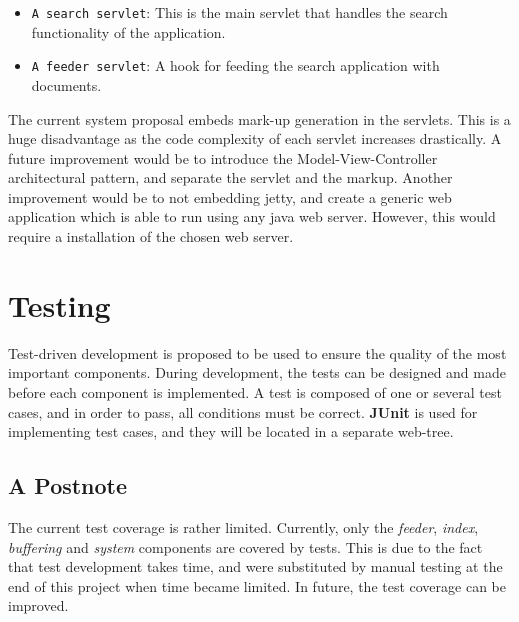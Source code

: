 \begin{itemize}
\item {\tt A search servlet}: This is the main servlet that handles the search functionality of the application.
\item {\tt A feeder servlet}: A hook for feeding the search application with documents.
\end{itemize}

The current system proposal embeds mark-up generation in the servlets. This is a huge disadvantage as the code complexity of each servlet increases drastically. A future improvement would be to introduce the Model-View-Controller architectural pattern, and separate the servlet and the markup. Another improvement would be to not embedding jetty, and create a generic web application which is able to run using any java web server. However, this would require a installation of the chosen web server.

\section{Testing}
Test-driven development is proposed to be used to ensure the quality of the most important components. During development, the tests can be designed and made before each component is implemented. A test is composed of one or several test cases, and in order to pass, all conditions must be correct. {\bf JUnit} is used for implementing test cases, and they will be located in a separate web-tree.

\subsection{A Postnote}
The current test coverage is rather limited. Currently, only the {\it feeder}, {\it index}, {\it buffering} and {\it system} components are covered by tests. This is due to the fact that test development takes time, and were substituted by manual testing at the end of this project when time became limited. In future, the test coverage can be improved.
